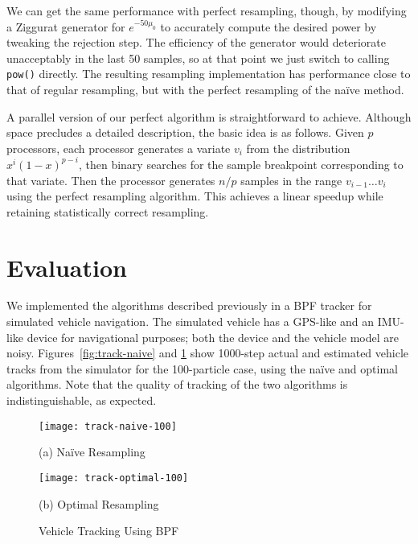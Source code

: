 \documentclass{article}
\begin{document}
  We can get the same performance with perfect resampling,
  though, by modifying a Ziggurat generator for
  $e^{-50\mu_0}$ to accurately compute the desired power by
  tweaking the rejection step.  The efficiency of the
  generator would deteriorate unacceptably in the last 50
  samples, so at that point we just switch to calling {\tt
  pow()} directly.  The resulting resampling implementation
  has performance close to that of regular resampling, but
  with the perfect resampling of the na\"ive method.

  A parallel version of our perfect algorithm is
  straightforward to achieve. Although space precludes a
  detailed description, the basic idea is as follows.  Given
  $p$ processors, each processor generates a variate $v_i$ from the
  distribution $x^i(1-x)^{p-i}$, then binary searches for
  the sample breakpoint corresponding to that variate.  Then
  the processor generates $n/p$ samples in the range
  $v_{i-1}\ldots v_i$ using the perfect resampling
  algorithm.  This achieves a linear speedup while retaining
  statistically correct resampling.

\section{Evaluation}

  We implemented the algorithms described previously in a
  BPF tracker for simulated vehicle navigation.  The
  simulated vehicle has a GPS-like and an IMU-like device
  for navigational purposes; both the device and the vehicle
  model are noisy.  Figures~\ref{fig:track-naive} and
  \ref{fig:track-optimal} show 1000-step actual and estimated vehicle
  tracks from the simulator for the 100-particle case, using
  the na\"ive and optimal algorithms.  Note
  that the quality of tracking of the two algorithms is
  indistinguishable, as expected.

  \begin{figure}
    \begin{minipage}{0.45\linewidth}
    \centering
    \texttt{[image: track-naive-100]}
    \begin{center}\small (a) Na\"ive Resampling\label{fig:track-naive}\end{center}
    \end{minipage}
    \begin{minipage}{0.45\linewidth}
    \centering
    \texttt{[image: track-optimal-100]}
    \begin{center}\small (b) Optimal Resampling\label{fig:track-optimal}\end{center}
    \end{minipage}
    \caption{Vehicle Tracking Using BPF}
  \end{figure}
\end{document}
